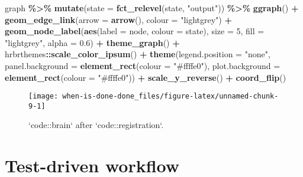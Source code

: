 \documentclass[
]{article}
\newenvironment{Shaded}{\begin{snugshade}}{\end{snugshade}}
\newcommand{\DataTypeTok}[1]{\textcolor[rgb]{0.13,0.29,0.53}{#1}}
\newcommand{\DecValTok}[1]{\textcolor[rgb]{0.00,0.00,0.81}{#1}}
\newcommand{\FloatTok}[1]{\textcolor[rgb]{0.00,0.00,0.81}{#1}}
\newcommand{\KeywordTok}[1]{\textcolor[rgb]{0.13,0.29,0.53}{\textbf{#1}}}
\newcommand{\NormalTok}[1]{#1}
\newcommand{\OperatorTok}[1]{\textcolor[rgb]{0.81,0.36,0.00}{\textbf{#1}}}
\newcommand{\StringTok}[1]{\textcolor[rgb]{0.31,0.60,0.02}{#1}}
\begin{document}
\begin{Shaded}
\begin{Highlighting}[]
\NormalTok{graph }\OperatorTok{\%>\%}\StringTok{ }
\StringTok{  }\KeywordTok{mutate}\NormalTok{(}\DataTypeTok{state =} \KeywordTok{fct\_relevel}\NormalTok{(state, }\StringTok{"output"}\NormalTok{)) }\OperatorTok{\%>\%}\StringTok{ }
\StringTok{  }\KeywordTok{ggraph}\NormalTok{() }\OperatorTok{+}
\StringTok{  }\KeywordTok{geom\_edge\_link}\NormalTok{(}\DataTypeTok{arrow =} \KeywordTok{arrow}\NormalTok{(), }\DataTypeTok{colour =} \StringTok{"lightgrey"}\NormalTok{) }\OperatorTok{+}\StringTok{ }
\StringTok{  }\KeywordTok{geom\_node\_label}\NormalTok{(}\KeywordTok{aes}\NormalTok{(}\DataTypeTok{label =}\NormalTok{ node, }\DataTypeTok{colour =}\NormalTok{ state),  }
                  \DataTypeTok{size =} \DecValTok{5}\NormalTok{,}
                  \DataTypeTok{fill =} \StringTok{"lightgrey"}\NormalTok{,}
                  \DataTypeTok{alpha =} \FloatTok{0.6}\NormalTok{) }\OperatorTok{+}
\StringTok{  }\KeywordTok{theme\_graph}\NormalTok{() }\OperatorTok{+}
\StringTok{  }\NormalTok{hrbrthemes}\OperatorTok{::}\KeywordTok{scale\_color\_ipsum}\NormalTok{() }\OperatorTok{+}
\StringTok{  }\KeywordTok{theme}\NormalTok{(}\DataTypeTok{legend.position =} \StringTok{"none"}\NormalTok{,}
        \DataTypeTok{panel.background =} \KeywordTok{element\_rect}\NormalTok{(}\DataTypeTok{colour =} \StringTok{"\#ffffe0"}\NormalTok{),}
        \DataTypeTok{plot.background =} \KeywordTok{element\_rect}\NormalTok{(}\DataTypeTok{colour =} \StringTok{"\#ffffe0"}\NormalTok{)) }\OperatorTok{+}\StringTok{ }
\StringTok{  }\KeywordTok{scale\_y\_reverse}\NormalTok{() }\OperatorTok{+}\StringTok{ }
\StringTok{  }\KeywordTok{coord\_flip}\NormalTok{()}
\end{Highlighting}
\end{Shaded}

\begin{figure}

{\centering \texttt{[image: when-is-done-done\_files/figure-latex/unnamed-chunk-9-1]} 

}

\caption{`code::brain` after `code::registration`.}\label{fig:unnamed-chunk-9}
\end{figure}

\hypertarget{test-driven-workflow}{%
\section{Test-driven workflow}\label{test-driven-workflow}}
\end{document}
